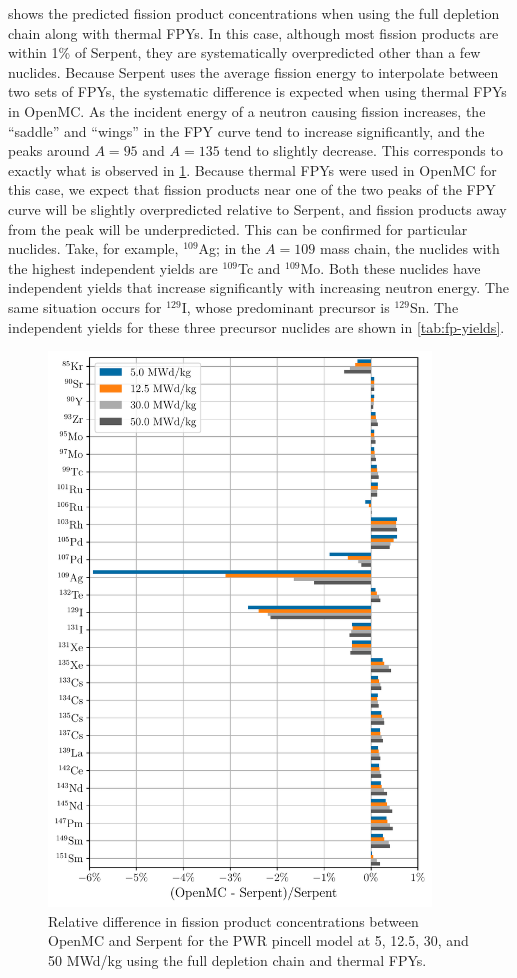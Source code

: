 \documentclass[3p,authoryear]{elsarticle}
\begin{document}
 shows the predicted fission product concentrations
when using the full depletion chain along with thermal FPYs. In this case,
although most fission products are within 1\% of Serpent, they are
systematically overpredicted other than a few nuclides. Because Serpent uses the
average fission energy to interpolate between two sets of FPYs, the systematic
difference is expected when using thermal FPYs in OpenMC. As the incident energy
of a neutron causing fission increases, the ``saddle'' and ``wings'' in the FPY
curve tend to increase significantly, and the peaks around $A=95$ and $A=135$
tend to slightly decrease. This corresponds to exactly what is observed in
\cref{fig:pwr-fp-full-thermal}. Because thermal FPYs were used in OpenMC for
this case, we expect that fission products near one of the two peaks of the FPY
curve will be slightly overpredicted relative to Serpent, and fission products
away from the peak will be underpredicted. This can be confirmed for particular
nuclides. Take, for example, $^{109}$Ag; in the $A=109$ mass chain, the nuclides
with the highest independent yields are $^{109}$Tc and $^{109}$Mo. Both these
nuclides have independent yields that increase significantly with increasing
neutron energy. The same situation occurs for $^{129}$I, whose predominant
precursor is $^{129}$Sn. The independent yields for these three precursor
nuclides are shown in \cref{tab:fp-yields}.
\begin{figure}[H]
  \centering
  \includegraphics[width=4in]{figures/pwr_fp_full_thermal.pdf}
  \caption{Relative difference in fission product concentrations between OpenMC
  and Serpent for the PWR pincell model at 5, 12.5, 30, and 50 MWd/kg using the
  full depletion chain and thermal FPYs.}
  \label{fig:pwr-fp-full-thermal}
\end{figure}
\end{document}
